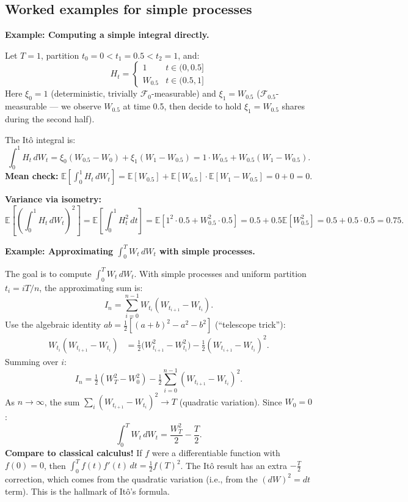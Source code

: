 \documentclass[11pt,a4paper]{article}
\theoremstyle{definition}
\theoremstyle{plain}
\theoremstyle{remark}
\newcommand{\E}{\mathbb{E}}
\newcommand{\F}{\mathcal{F}}
\begin{document}
\subsection{Worked examples for simple processes}

\begin{workedex}
\textbf{Example: Computing a simple integral directly.}

Let $T = 1$, partition $t_0 = 0 < t_1 = 0.5 < t_2 = 1$, and:
\[
  H_t = \begin{cases} 1 & t \in (0, 0.5] \\ W_{0.5} & t \in (0.5, 1] \end{cases}
\]
Here $\xi_0 = 1$ (deterministic, trivially $\F_0$-measurable) and $\xi_1 = W_{0.5}$ ($\F_{0.5}$-measurable — we observe $W_{0.5}$ at time 0.5, then decide to hold $\xi_1 = W_{0.5}$ shares during the second half).

The Itô integral is:
\[
  \int_0^1 H_t\,dW_t = \xi_0(W_{0.5} - W_0) + \xi_1(W_1 - W_{0.5}) = 1 \cdot W_{0.5} + W_{0.5}(W_1 - W_{0.5}).
\]
\textbf{Mean check:} $\E[\int_0^1 H_t\,dW_t] = \E[W_{0.5}] + \E[W_{0.5}]\cdot\E[W_1 - W_{0.5}] = 0 + 0 = 0$. \checkmark

\textbf{Variance via isometry:}
\[
  \E\left[\left(\int_0^1 H_t\,dW_t\right)^2\right] = \E\left[\int_0^1 H_t^2\,dt\right] = \E\left[1^2\cdot 0.5 + W_{0.5}^2 \cdot 0.5\right] = 0.5 + 0.5\E[W_{0.5}^2] = 0.5 + 0.5 \cdot 0.5 = 0.75.
\]
\end{workedex}

\begin{workedex}
\textbf{Example: Approximating $\int_0^T W_t\,dW_t$ with simple processes.}

The goal is to compute $\int_0^T W_t\,dW_t$. With simple processes and uniform partition $t_i = iT/n$, the approximating sum is:
\[
  I_n = \sum_{i=0}^{n-1} W_{t_i}(W_{t_{i+1}} - W_{t_i}).
\]
Use the algebraic identity $ab = \frac{1}{2}[(a+b)^2 - a^2 - b^2]$ (``telescope trick''):
\begin{align*}
  W_{t_i}(W_{t_{i+1}} - W_{t_i}) &= \tfrac{1}{2}\bigl(W_{t_{i+1}}^2 - W_{t_i}^2\bigr) - \tfrac{1}{2}(W_{t_{i+1}} - W_{t_i})^2.
\end{align*}
Summing over $i$:
\[
  I_n = \tfrac{1}{2}(W_T^2 - W_0^2) - \tfrac{1}{2}\sum_{i=0}^{n-1}(W_{t_{i+1}} - W_{t_i})^2.
\]
As $n \to \infty$, the sum $\sum_i (W_{t_{i+1}} - W_{t_i})^2 \to T$ (quadratic variation). Since $W_0 = 0$:
\[
  \int_0^T W_t\,dW_t = \frac{W_T^2}{2} - \frac{T}{2}.
\]
\textbf{Compare to classical calculus!} If $f$ were a differentiable function with $f(0)=0$, then $\int_0^T f(t)f'(t)\,dt = \frac{1}{2}f(T)^2$. The Itô result has an extra $-\frac{T}{2}$ correction, which comes from the quadratic variation (i.e., from the $(dW)^2 = dt$ term). This is the hallmark of Itô's formula.
\end{workedex}
\end{document}
